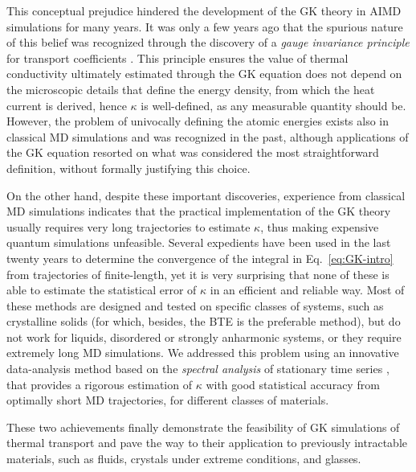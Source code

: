 This conceptual prejudice hindered the development of the GK theory in AIMD simulations for many years. It was only a few years ago that the spurious nature of this belief was recognized through the discovery of a \emph{gauge invariance principle} for transport coefficients \cite{Marcolongo2016,Ercole2016}. 
This principle ensures the value of thermal conductivity ultimately estimated through the GK equation does not depend on the microscopic details that define the energy density, from which the heat current is derived, hence $\kappa$ is well-defined, as any measurable quantity should be. 
However, the problem of univocally defining the atomic energies exists also in classical MD simulations and was recognized in the past, although applications of the GK equation resorted on what was considered the most straightforward definition, without formally justifying this choice. 

On the other hand, despite these important discoveries, experience from classical MD simulations indicates that the practical implementation of the GK theory usually requires very long trajectories to estimate $\kappa$, thus making expensive quantum simulations unfeasible. 
Several expedients have been used in the last twenty years to determine the convergence of the integral in Eq.~\eqref{eq:GK-intro} from trajectories of finite-length, yet it is very surprising that none of these is able to estimate the statistical error of $\kappa$ in an efficient and reliable way. Most of these methods are designed and tested on specific classes of systems, such as crystalline solids (for which, besides, the BTE is the preferable method), but do not work for liquids, disordered or strongly anharmonic systems, or they require extremely long MD simulations. 
We addressed this problem using an innovative data-analysis method based on the \emph{spectral analysis} of stationary time series \cite{Ercole2017}, that provides a rigorous estimation of $\kappa$ with good statistical accuracy from optimally short MD trajectories, for different classes of materials. 

These two achievements finally demonstrate the feasibility of \abinitio GK simulations of thermal transport and pave the way to their application to previously intractable materials, such as fluids, crystals under extreme conditions, and glasses. 


